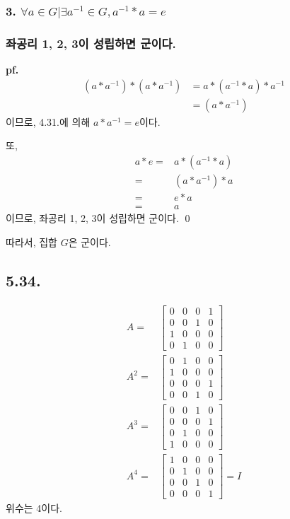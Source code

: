 \documentclass{article}
\begin{document}
\subsubsection{3. $\forall a \in G | \exists a^{-1} \in G, a^{-1} * a = e$}

\subsubsection{좌공리 1, 2, 3이 성립하면 군이다.}
\textbf{pf.}
\begin{align*}
(a * a^{-1}) * (a * a^{-1}) &= a * (a^{-1} * a) * a^{-1}
\\ &= (a * a^{-1})
\end{align*}
이므로, 4.31.에 의해 $a * a^{-1} = e$이다.

또,
\begin{align*}
a * e =& a * (a^{-1} * a)
\\ =& (a * a^{-1}) * a
\\ =& e * a
\\ =& a
\end{align*}
이므로, 좌공리 1, 2, 3이 성립하면 군이다. \qed

따라서, 집합 $G$은 군이다.



\subsection{5.34.}
\begin{align*}
A =& \begin{bmatrix}0 & 0 & 0 & 1\\ 0 & 0 & 1 & 0\\ 1 & 0 & 0 & 0\\ 0 & 1 & 0 & 0\end{bmatrix}
\\ A^2 =& \begin{bmatrix}0 & 1 & 0 & 0\\ 1 & 0 & 0 & 0\\ 0 & 0 & 0 & 1\\ 0 & 0 & 1 & 0\end{bmatrix}
\\ A^3 =& \begin{bmatrix}0 & 0 & 1 & 0\\ 0 & 0 & 0 & 1\\ 0 & 1 & 0 & 0\\ 1 & 0 & 0 & 0\end{bmatrix}
\\ A^4 =& \begin{bmatrix}1 & 0 & 0 & 0\\ 0 & 1 & 0 & 0\\ 0 & 0 & 1 & 0\\ 0 & 0 & 0 & 1\end{bmatrix} = I
\end{align*}
위수는 4이다.
\end{document}
